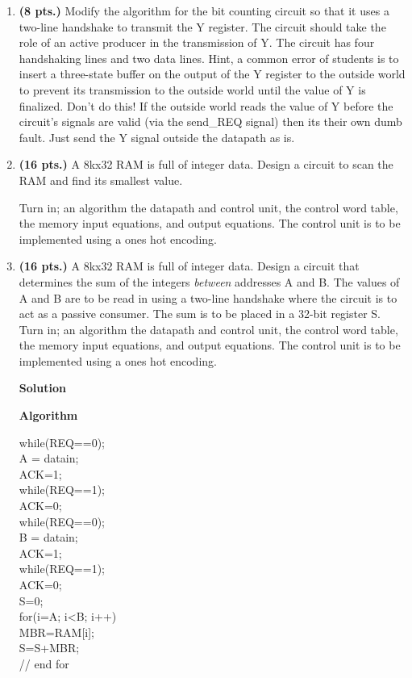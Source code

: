 \begin{enumerate}
\item \textbf{ (8 pts.)}
Modify the algorithm for the bit counting circuit so that it uses a 
two-line handshake to transmit the Y register.  The circuit should take
the role of an active producer in the transmission of Y.  The circuit
has four handshaking lines and two data lines.  Hint, a common
error of students is to insert a three-state buffer on the output of
the Y register to the outside world to prevent its transmission to
the outside world until the value of Y is finalized.  Don't do this!
If the outside world reads the value of Y before the circuit's signals
are valid (via the send\_REQ signal) then its their own dumb fault.
Just send the Y signal outside the datapath as is.

\item \textbf{ (16 pts.)} 
A 8kx32 RAM is full of integer data.  Design a circuit to scan
the RAM and find its smallest value.  

Turn in; an algorithm the datapath and control unit, the control word 
table, the memory input equations, and output equations.  
The control unit is to be implemented using a ones hot encoding.


\item \textbf{ (16 pts.)}
A 8kx32 RAM is full of integer data.  Design a
circuit that determines the sum of the integers {\em between} addresses
A and B.  The values of A and B are to be read in using a two-line
handshake where the circuit is to act as a passive consumer.  
The sum is to be placed in a 32-bit register S.
Turn in; an algorithm the datapath and control unit, the control word 
table, the memory input equations, and output equations.  
The control unit is to be implemented using a ones hot encoding.

\begin{onlysolution}  \textbf{Solution} \itshape{

\textbf{ Algorithm}

while(REQ==0); \\
A = datain; \\
ACK=1; \\
while(REQ==1); \\
ACK=0; \\
while(REQ==0); \\
B = datain; \\
ACK=1; \\
while(REQ==1); \\
ACK=0; \\
S=0; \\
for(i=A; i<B; i++)  { \\
 MBR=RAM[i]; \\
 S=S+MBR; \\
} // end for \\

}
\end{onlysolution}
\end{enumerate}
